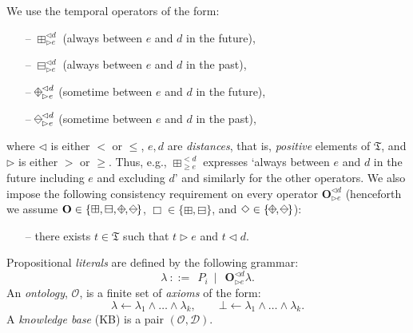 \documentclass{article}
\newcommand{\D}{\mathcal{D}}
\renewcommand{\O}{\mathcal{O}}
\newcommand{\diamondplus}{%
  \raisebox{-.15ex}{\begin{tikzpicture}
    \useasboundingbox (-0.7ex, -0.9ex) rectangle (0.7ex, 0.9ex);
    \node (w) at (-0.8ex,0) {};
    \node (e) at (+0.8ex,0) {};
    \node (s) at (0,-.9ex) {};
    \node (n) at (0,+.9ex) {};
    \draw (n.center) -- (e.center) -- (s.center) -- (w.center) -- (n.center);
    \draw (n.center) -- (s.center);
    \draw (e.center) -- (w.center);
  \end{tikzpicture}}}
\newcommand{\diamondminus}{%
  \raisebox{-.15ex}{\begin{tikzpicture}
    \useasboundingbox (-0.7ex, -0.9ex) rectangle (0.7ex, 0.9ex);
    \node (w) at (-0.8ex,0) {};
    \node (e) at (+0.8ex,0) {};
    \node (s) at (0,-.9ex) {};
    \node (n) at (0,+.9ex) {};
    \draw (n.center) -- (e.center) -- (s.center) -- (w.center) -- (n.center);
    \draw (e.center) -- (w.center);
  \end{tikzpicture}}}
\begin{document}
We use the temporal operators of the form:
\begin{itemize}
 \item[--] $\boxplus^{\lhd d}_{\rhd e}$ (always between $e$ and $d$ in the future),
 \item[--] $\boxminus^{\lhd d}_{\rhd e}$ (always between $e$ and $d$ in the past),
 \item[--] $\diamondplus^{\lhd d}_{\rhd e}$ (sometime between $e$ and $d$ in the future),
 \item[--] $\diamondminus^{\lhd d}_{\rhd e}$ (sometime between $e$ and $d$ in the past),
\end{itemize}
%
 where $\lhd$ is either $<$ or $\leqslant$, $e,d$ are \emph{distances}, that is, \emph{positive} elements of $\mathfrak{T}$, and $\rhd$ is either $>$ or $\geqslant$. Thus, e.g., $\boxplus^{< d}_{\geqslant e}$ expresses `always between $e$ and $d$ in the future including $e$ and excluding $d$' and similarly for the other operators. We also impose the following consistency requirement on every operator $\mathbf{O}^{\lhd d}_{\rhd e}$ (henceforth we assume $\mathbf{O} \in \{ \boxplus, \boxminus, \diamondplus, \diamondminus \}$, $\mathbf{\Box} \in \{ \boxplus, \boxminus\}$, and $\Diamond \in \{\diamondplus, \diamondminus \}$):
%
\begin{itemize}
  \item[--] there exists $t \in \mathfrak{T}$ such that $t \rhd e$ and $t \lhd d$.
\end{itemize}
%
Propositional \emph{literals} are defined by the following grammar:
%
$$\lambda \ ::= \ \ P_i \ \mid \ \ \mathbf{O}^{\lhd d}_{\rhd e} \lambda.
$$
%
An \emph{ontology}, $\O$, is a finite set of \emph{axioms} of the form:
%
\begin{equation}\label{clauses}
  \lambda \leftarrow \lambda_1 \land \dots \land \lambda_k, \qquad \bot \leftarrow \lambda_1 \land \dots \land \lambda_k.
\end{equation}
%
A \emph{knowledge base} (KB) is a pair $(\O, \D)$.
%
\end{document}
